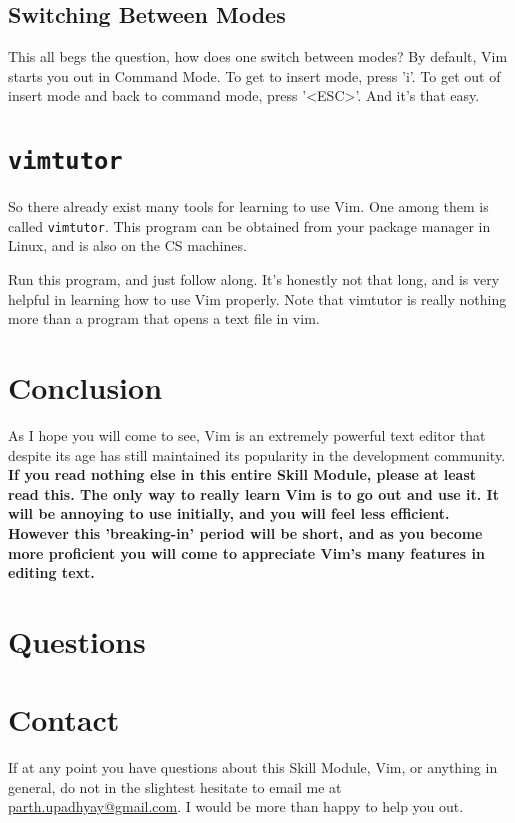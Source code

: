 \subsection{Switching Between Modes}
This all begs the question, how does one switch between modes? By default, Vim
starts you out in Command Mode. To get to insert mode, press 'i'. To get out of
insert mode and back to command mode, press '<ESC>'. And it's that easy.

\section{\texttt{vimtutor}}
So there already exist many tools for learning to use Vim. One among them is called
\texttt{vimtutor}. This program can be obtained from your package manager in Linux,
and is also on the CS machines.

Run this program, and just follow along. It's honestly not that long, and is very
helpful in learning how to use Vim properly. Note that vimtutor is really nothing
more than a program that opens a text file in vim.

\section{Conclusion}
As I hope you will come to see, Vim is an extremely powerful text editor that
despite its age has still maintained its popularity in the development
community. {\bf If you read nothing else in this entire Skill Module, please
at least read this. The only way to really learn Vim is to go out and use it.
It will be annoying to use initially, and you will feel less efficient. However
this 'breaking-in' period will be short, and as you become more proficient
you will come to appreciate Vim's many features in editing text.}

\section{Questions}

\section{Contact}
If at any point you have questions about this Skill Module, Vim, or anything
in general, do not in the slightest hesitate to email me at 
\url{parth.upadhyay@gmail.com}. I would be more than happy to help you out.


